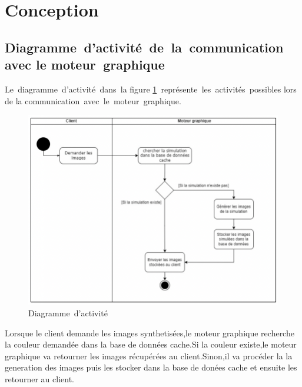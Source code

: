 \newpage
\section{Conception}
\subsection{Diagramme\textcolor{white}{J}d’activité\textcolor{white}{J}de\textcolor{white}{J}la\textcolor{white}{J}communication avec le moteur\textcolor{white}{J}graphique }

Le\textcolor{white}{J}diagramme\textcolor{white}{J}d’activité\textcolor{white}{J}dans\textcolor{white}{J}la figure \ref{fig:actEspClient}\textcolor{white}{J}représente\textcolor{white}{J}les\textcolor{white}{J}activités\textcolor{white}{J}possibles lors de la communication\textcolor{white}{J}avec\textcolor{white}{J}le\textcolor{white}{J}moteur\textcolor{white}{J}graphique.

\begin{figure}[!ht]\centering
\includegraphics[width=1\textwidth,angle=00]{chapitres/chapitre3/figures/DiagAct-Moteur.png}
\caption{Diagramme\textcolor{white}{J}d'activité}
\label{fig:actEspClient}
\end{figure}

Lorsque le client demande les images synthetisées,le moteur graphique recherche la couleur demandée dans la base de données cache.Si la couleur existe,le moteur graphique va retourner les images récupérées au client.Sinon,il va procéder la la generation des images puis les stocker dans la base de donées cache et ensuite les retourner au client.

